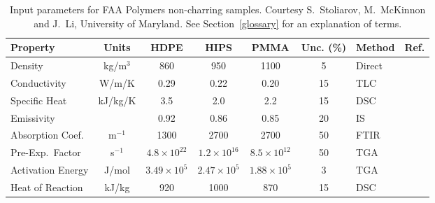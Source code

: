 \begin{table}[h!]
\caption[FAA non-charring polymer properties.]{Input parameters for FAA Polymers non-charring samples. Courtesy S.~Stoliarov, M.~McKinnon and J.~Li, University of Maryland.
See Section~\ref{glossary} for an explanation of terms.}
\begin{center}
\begin{tabular}{|l|c|c|c|c|c|l|l|}
\hline
Property                    & Units         & HDPE                  & HIPS                  & PMMA                  & Unc. (\%) & Method                &  Ref.                         \\ \hline \hline
Density                     & kg/m$^3$      & 860                   & 950                   & 1100                  & 5         & Direct                &  \cite{Stoliarov:CF2009}      \\ \hline
Conductivity                & W/m/K         & 0.29                  & 0.22                  & 0.20                  & 15        & TLC                   &  \cite{Stoliarov:CF2009}      \\ \hline
Specific Heat               & kJ/kg/K       & 3.5                   & 2.0                   & 2.2                   & 15        & DSC                   &  \cite{Stoliarov:PDS2008}     \\ \hline
Emissivity                  &               & 0.92                  & 0.86                  & 0.85                  & 20        & IS                    &  \cite{Hallman:PES1974}       \\ \hline
Absorption Coef.            & m$^{-1}$      & 1300                  & 2700                  & 2700                  & 50        & FTIR                  &  \cite{Tsilingiris:ECM2003}   \\ \hline
Pre-Exp.~Factor             & s$^{-1}$      & $4.8 \times 10^{22}$  & $1.2 \times 10^{16}$  & $8.5 \times 10^{12}$  & 50        & TGA                   &  \cite{Stoliarov:CF2009}      \\ \hline
Activation Energy           & J/mol       & $3.49 \times 10^{5}$  & $2.47 \times 10^{5}$  & $1.88 \times 10^{5}$  & 3         & TGA                   &  \cite{Stoliarov:CF2009}      \\ \hline
Heat of Reaction            & kJ/kg         & 920                   & 1000                  & 870                   & 15        & DSC                   &  \cite{Stoliarov:PDS2008}     \\ \hline
\end{tabular}
\end{center}
\label{FAA_Properties}
\end{table}



